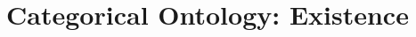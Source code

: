 \documentclass[a4paper]{../birkjour}
\title{Categorical Ontology: Existence}
\begin{document}

\maketitle

\tableofcontents
  
  
  
  
  
  \appendix
  
 
  {}
  
\end{document}
